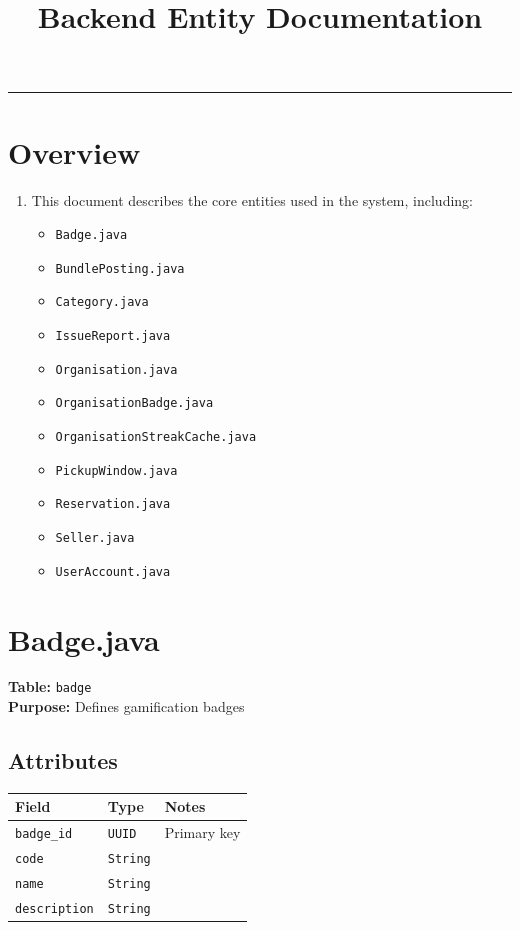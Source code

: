 \documentclass[a4paper,11pt]{article}
\title{Backend Entity Documentation}
\date{}
\begin{document}
\maketitle
\hrule
\vspace{1em}


\section*{Overview}

\begin{enumerate}
    \item This document describes the core entities used in the system, including:
    \begin{itemize}
        \item \texttt{Badge.java}
        \item \texttt{BundlePosting.java}
        \item \texttt{Category.java}
        \item \texttt{IssueReport.java}
        \item \texttt{Organisation.java}
        \item \texttt{OrganisationBadge.java}
        \item \texttt{OrganisationStreakCache.java}
        \item \texttt{PickupWindow.java}
        \item \texttt{Reservation.java}
        \item \texttt{Seller.java}
        \item \texttt{UserAccount.java}
    \end{itemize}
\end{enumerate}




\section{Badge.java}

\textbf{Table:} \texttt{badge} \\
\textbf{Purpose:} Defines gamification badges

\subsection*{Attributes}
\begin{longtable}{|p{4cm}|p{3cm}|p{6cm}|}
\hline
\textbf{Field} & \textbf{Type} & \textbf{Notes} \\
\hline
\texttt{badge\_id} & \texttt{UUID} & Primary key \\
\texttt{code} & \texttt{String} &  \\
\texttt{name} & \texttt{String} &  \\
\texttt{description} & \texttt{String} &  \\
\hline
\end{longtable}
\end{document}
